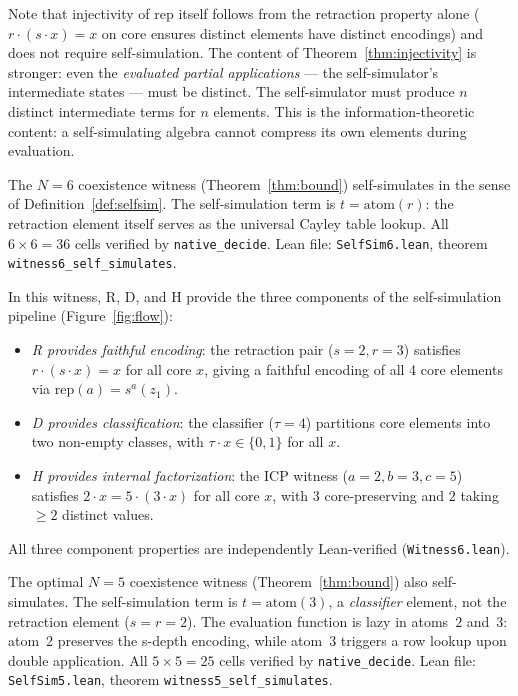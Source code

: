 \documentclass[sigconf,screen]{acmart}
\newcommand{\dotop}{\cdot}
\theoremstyle{remark}
\begin{document}
Note that injectivity of $\text{rep}$ itself follows from the retraction property alone ($r \dotop (s \dotop x) = x$ on core ensures distinct elements have distinct encodings) and does not require self-simulation. The content of Theorem~\ref{thm:injectivity} is stronger: even the \emph{evaluated partial applications} --- the self-simulator's intermediate states --- must be distinct. The self-simulator must produce $n$ distinct intermediate terms for $n$ elements. This is the information-theoretic content: a self-simulating algebra cannot compress its own elements during evaluation.

\begin{theorem}[Self-Simulation at $N\!=\!6$]
\label{thm:selfsim6}
The $N\!=\!6$ coexistence witness (Theorem~\ref{thm:bound}) self-simulates in the sense of Definition~\ref{def:selfsim}. The self-simulation term is $t = \text{atom}(r)$: the retraction element itself serves as the universal Cayley table lookup. All $6 \times 6 = 36$ cells verified by \texttt{native\_decide}. Lean file: \texttt{SelfSim6.lean}, theorem \texttt{witness6\_self\_simulates}.
\end{theorem}

In this witness, R, D, and H provide the three components of the self-simulation pipeline (Figure~\ref{fig:flow}):
\begin{itemize}
  \item \emph{R provides faithful encoding}: the retraction pair ($s\!=\!2, r\!=\!3$) satisfies $r \dotop (s \dotop x) = x$ for all core $x$, giving a faithful encoding of all 4 core elements via $\text{rep}(a) = s^a(z_1)$.
  \item \emph{D provides classification}: the classifier ($\tau\!=\!4$) partitions core elements into two non-empty classes, with $\tau \dotop x \in \{0, 1\}$ for all $x$.
  \item \emph{H provides internal factorization}: the ICP witness ($a\!=\!2, b\!=\!3, c\!=\!5$) satisfies $2 \dotop x = 5 \dotop (3 \dotop x)$ for all core $x$, with $3$ core-preserving and $2$ taking $\geq 2$ distinct values.
\end{itemize}
All three component properties are independently Lean-verified (\texttt{Witness6.lean}).

\begin{theorem}[Self-Simulation at $N\!=\!5$]
\label{thm:selfsim5}
The optimal $N\!=\!5$ coexistence witness (Theorem~\ref{thm:bound}) also self-simulates. The self-simulation term is $t = \text{atom}(3)$, a \emph{classifier} element, not the retraction element ($s\!=\!r\!=\!2$). The evaluation function is lazy in atoms~$2$ and~$3$: atom~$2$ preserves the s-depth encoding, while atom~$3$ triggers a row lookup upon double application. All $5 \times 5 = 25$ cells verified by \texttt{native\_decide}. Lean file: \texttt{SelfSim5.lean}, theorem \texttt{witness5\_self\_simulates}.
\end{theorem}
\end{document}
